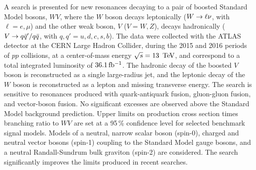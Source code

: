 
A search is presented for new resonances decaying to a pair of boosted Standard Model bosons, $WV$, where the $W$ boson decays leptonically ($W\rightarrow\ell\nu$, with $\ell=e,\mu$) and the other weak boson, $V$ ($V=W,Z$), decays hadronically ($V\rightarrow q\bar{q}'/q\bar{q}$, with $q,q'=u,d,c,s,b$).  The data were collected with the ATLAS detector at the CERN Large Hadron Collider, during the 2015 and 2016 periods of $pp$ collisions, at a center-of-mass energy $\sqrt{s}=13\,\TeV$, and correspond to a total integrated luminosity of $36.1\,\mbox{fb$^{-1}$}$.  
The hadronic decay of the boosted $V$ boson is reconstructed as a single large-radius jet, and the leptonic decay of the $W$ boson is reconstructed as a lepton and missing transverse energy. The search is sensitive to resonances produced with quark-antiquark fusion, gluon-gluon fusion, and vector-boson fusion.  No significant excesses are observed above the Standard Model background prediction. Upper limits on production cross section times branching ratio to $WV$ are set at a 95\,\% confidence level for selected benchmark signal models. Models of a neutral, narrow scalar boson (spin-0), charged and neutral vector bosons (spin-1) coupling to the Standard Model gauge bosons, and a neutral Randall-Sundrum bulk graviton (spin-2) are considered. The search significantly improves the limits produced in recent searches. 
